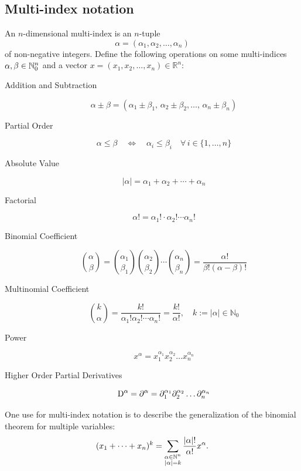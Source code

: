 \documentclass[11pt,a4paper]{article}
\begin{document}
\subsection{Multi-index notation}
An $n$-dimensional multi-index is an $n$-tuple
\[
  \alpha = (\alpha_{1},\alpha_{2},\ldots,\alpha_{n})
\]
of non-negative integers. Define the following operations on some
multi-indices $\alpha ,\beta \in \mathbb{N}_{0}^{n}$ and a vector
$x=(x_{1},x_{2},\ldots ,x_{n})\in \mathbb {R} ^{n}$:
\begin{description}
  \item[Addition and Subtraction] 
  \[
    \alpha \pm \beta =
    (\alpha _{1}\pm \beta _{1},\,\alpha _{2}\pm 
    \beta _{2},\ldots ,\,\alpha _{n}\pm \beta _{n})
  \]
  \item[Partial Order] 
  \[
    \alpha \leq \beta \quad \Leftrightarrow \quad 
    \alpha _{i}\leq \beta _{i}\quad \forall \,i\in \{1,\ldots ,n\}
  \]
  \item[Absolute Value] 
  \[
    |\alpha |=\alpha _{1}+\alpha _{2}+\cdots +\alpha _{n}
  \]
  \item[Factorial] 
  \[
    \alpha !=\alpha _{1}!\cdot \alpha _{2}!\cdots \alpha _{n}!
  \]
  \item[Binomial Coefficient] 
  \[
    {\binom {\alpha}{\beta}} = 
    {\binom {\alpha_{1}}{\beta_{1}}}
    {\binom {\alpha_{2}}{\beta_{2}}}\cdots 
    {\binom {\alpha_{n}}{\beta_{n}}} = 
    {\frac {\alpha!}{\beta! (\alpha-\beta)!}}
  \]
  \item[Multinomial Coefficient] 
  \[
    {\binom {k}{\alpha}} = 
    {\frac {k!}{\alpha_{1}!\alpha_{2}! \cdots \alpha_{n}!}} = 
    {\frac {k!}{\alpha!}}, 
    \quad k:=|\alpha |\in \mathbb {N}_{0}
  \]
  \item[Power] 
  \[
    x^{\alpha} = 
    x_{1}^{\alpha_{1}}x_{2}^{\alpha_{2}}\ldots x_{n}^{\alpha_{n}}
  \]
  \item[Higher Order Partial Derivatives] 
  \[
    \mathrm{D}^{\alpha} =
    \partial^{\alpha} = 
    \partial_{1}^{\alpha_{1}}
    \partial_{2}^{\alpha_{2}} \dots 
    \partial_{n}^{\alpha_{n}}
  \]
\end{description}

\begin{remark}
  One use for multi-index notation is to describe the
  generalization of the binomial theorem for multiple variables:
  \[
    (x_1 + \cdots + x_n)^k =
    \sum_{\substack{\alpha \in \mathbb{N}^n \\ |\alpha| = k}}
    \frac{|\alpha|!}{\alpha!} x^{\alpha}.
  \]
\end{remark}
\end{document}
